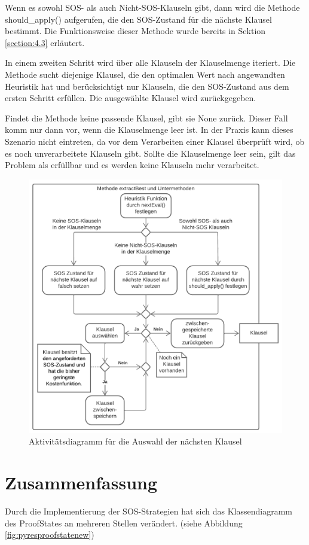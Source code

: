 Wenn es sowohl SOS- als auch Nicht-SOS-Klauseln gibt, dann wird die Methode should\_apply() aufgerufen, die den SOS-Zustand für die nächste Klausel bestimmt. Die Funktionsweise dieser Methode wurde bereits in Sektion \ref{section:4.3} erläutert.

In einem zweiten Schritt wird über alle Klauseln der Klauselmenge iteriert. Die Methode sucht diejenige Klausel, die den optimalen Wert nach angewandten Heuristik hat und berücksichtigt nur Klauseln, die den SOS-Zustand aus dem ersten Schritt erfüllen. Die ausgewählte Klausel wird zurückgegeben.

Findet die Methode keine passende Klausel, gibt sie None zurück. Dieser Fall komm nur dann vor, wenn die Klauselmenge leer ist. In der Praxis kann dieses Szenario nicht eintreten, da vor dem Verarbeiten einer Klausel überprüft wird, ob es noch unverarbeitete Klauseln gibt. Sollte die Klauselmenge leer sein, gilt das Problem als erfüllbar und es werden keine Klauseln mehr verarbeitet.

\begin{figure}
	\centering
	\includegraphics[width=0.9\linewidth]{images/Lucid/SelectNext}
	\caption{Aktivitätsdiagramm für die Auswahl der nächsten Klausel}
	\label{fig:selectnext}
\end{figure}

\section{Zusammenfassung}
Durch die Implementierung der SOS-Strategien hat sich das Klassendiagramm des ProofStates an mehreren Stellen verändert. (siehe Abbildung \ref{fig:pyresproofstatenew})


